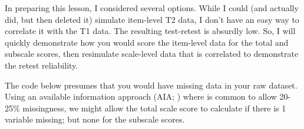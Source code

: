 \documentclass[
  english,
]{book}
\newenvironment{Shaded}{\begin{snugshade}}{\end{snugshade}}
\newcommand{\CommentTok}[1]{\textcolor[rgb]{0.56,0.35,0.01}{\textit{#1}}}
\newcommand{\FloatTok}[1]{\textcolor[rgb]{0.00,0.00,0.81}{#1}}
\newcommand{\KeywordTok}[1]{\textcolor[rgb]{0.13,0.29,0.53}{\textbf{#1}}}
\newcommand{\NormalTok}[1]{#1}
\newcommand{\OperatorTok}[1]{\textcolor[rgb]{0.81,0.36,0.00}{\textbf{#1}}}
\newcommand{\StringTok}[1]{\textcolor[rgb]{0.31,0.60,0.02}{#1}}
\begin{document}
In preparing this lesson, I considered several options. While I could (and actually did, but then deleted it) simulate item-level T2 data, I don't have an easy way to correlate it with the T1 data. The resulting test-retest is absurdly low. So, I will quickly demonstrate how you would score the item-level data for the total and subscale scores, then resimulate scale-level data that is correlated to demonstrate the retest reliability.

The code below presumes that you would have missing data in your raw dataset. Using an available information approach (AIA; \citep{parent_handling_2013}) where is common to allow 20-25\% missingness, we might allow the total scale score to calculate if there is 1 variable missing; but none for the subscale scores.

\begin{Shaded}
\end{Shaded}
\end{document}
